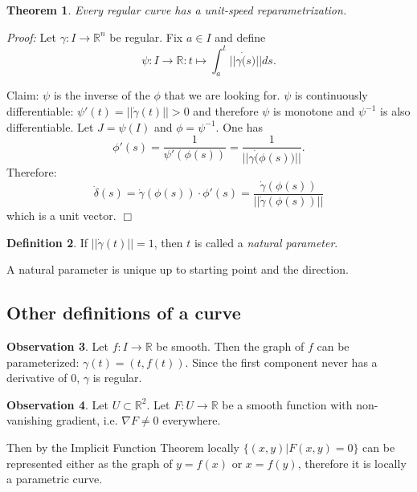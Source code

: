 \documentclass[a4paper,11pt,notitlepage,fullpage]{paper}
\theoremstyle{plain}
\newtheorem{thm}{Theorem}[section] %
\theoremstyle{definition}
\newtheorem{defn}[thm]{Definition} %
\newtheorem{obsv}[thm]{Observation}
\begin{document}
\begin{thm}
Every regular curve has a unit-speed reparametrization.
\end{thm}
\emph{Proof:} Let $\gamma: I \to \mathbb R^n$ be regular. Fix $a \in I$ and define
\begin{equation*}
\psi: I \to \mathbb R: t \mapsto \int_a^t ||\gamma\dot(s)|| ds.
\end{equation*}

Claim: $\psi$ is the inverse of the $\phi$ that we are looking for.
$\psi$ is continuously differentiable: $\psi'(t) = ||\dot\gamma(t)|| > 0$ and therefore $\psi$ is monotone and $\psi^{-1}$ is also differentiable.
Let $J = \psi(I)$ and $\phi = \psi^{-1}$. One has
\begin{equation*}
\phi'(s) = \frac{1}{\psi'(\phi(s))} = \frac{1}{||\gamma\dot(\phi(s))||}.
\end{equation*}
Therefore: 
\begin{equation*}
\dot\delta(s) = \dot\gamma(\phi(s)) \cdot \phi'(s) = \frac{\dot\gamma(\phi(s))}{||\dot\gamma(\phi(s))||}
\end{equation*}
which is a unit vector. \hfill $\Box$


\begin{defn}
If $||\dot\gamma(t)|| = 1$, then $t$ is called a \emph{natural parameter}.

A natural parameter is unique up to starting point and the direction.
\end{defn}


\subsection{Other definitions of a curve}


\begin{obsv}
Let $f: I \to \mathbb R$ be smooth. Then the graph of $f$ can be parameterized: $\gamma(t) = (t, f(t))$. Since the first component never has a derivative of $0$, $\gamma$ is regular.
\end{obsv}

\begin{obsv}
Let $U \subset \mathbb R^2$. Let $F: U \to \mathbb R$ be a smooth function with non-vanishing gradient, i.e. $\nabla F \neq 0$ everywhere.

Then by the Implicit Function Theorem locally $\{(x,y)|F(x,y) = 0\}$ can be represented either as the graph of $y = f(x)$ or $x = f(y)$, therefore it is locally a parametric curve.
\end{obsv}
\end{document}
